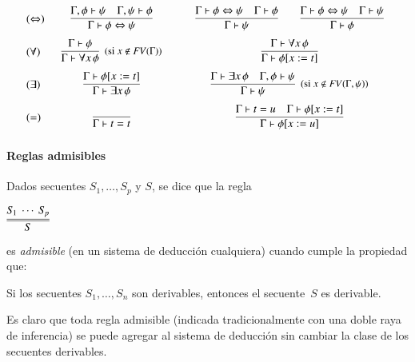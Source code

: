 \documentclass[a4paper,12pt]{book}
\def\liff{\Leftrightarrow}
\def\FV{\mathit{FV}}
\theoremstyle{definition}
\begin{document}
$$\begin{array}{lc@{\qquad}c}
  \noalign{\myskip}
  ({\liff}) & \begin{array}{c}
    \infer{\Gamma\vdash\phi\liff\psi}{
      \Gamma,\phi\vdash\psi & \Gamma,\psi\vdash\phi}
  \end{array} & \begin{array}{c}
    \infer{\Gamma\vdash\psi}
    {\Gamma\vdash\phi\liff\psi & \Gamma\vdash\phi}\qquad
    \infer{\Gamma\vdash\phi}
    {\Gamma\vdash\phi\liff\psi & \Gamma\vdash\psi}
  \end{array} \\
  \noalign{\myskip}
  ({\forall}) & \begin{array}{c}
    \infer[\text{\small(si $x\notin\FV(\Gamma)$)}]
    {\Gamma\vdash\forall x\,\phi}{\Gamma\vdash\phi}
  \end{array} & \begin{array}{c}
    \infer{\Gamma\vdash\phi[x:=t]}{\Gamma\vdash\forall x\,\phi}
  \end{array} \\
  \noalign{\myskip}
  ({\exists}) & \begin{array}{c}
    \infer{\Gamma\vdash\exists x\,\phi}{\Gamma\vdash\phi[x:=t]}
  \end{array} & \begin{array}{c}
    \infer[\text{\small(si $x\notin\FV(\Gamma,\psi)$)}]
    {\Gamma\vdash\psi}
    {\Gamma\vdash\exists x\,\phi & \Gamma,\phi\vdash\psi}
  \end{array} \\
  \noalign{\myskip}
  ({=}) & \begin{array}{c}
    \infer{\Gamma\vdash t=t}{\mathstrut}
  \end{array} & \begin{array}{c}
    \infer{\Gamma\vdash\phi[x:=u]}
    {\Gamma\vdash t=u & \Gamma\vdash\phi[x:=t]}
  \end{array} \\
\end{array}$$

\newpage
\paragraph{Reglas admisibles}\label{p:ReglasAdmisibles}
Dados secuentes $S_{\!1},\ldots,S_{\!p}$ y $S$, se dice que la regla
\begin{center}
  $\infer={S}{S_{\!1}~\cdots~S_{\!p}}$
\end{center}
es \emph{admisible} (en un sistema de deducción cualquiera) cuando
cumple la propiedad que:
\begin{center}
  Si los secuentes $S_1,\ldots,S_n$ son derivables, entonces
  el secuente~$S$ es derivable.
\end{center}
Es claro que toda regla admisible (indicada tradicionalmente con
una doble raya de inferencia) se puede agregar al sistema de
deducción sin cambiar la clase de los secuentes derivables.
\end{document}
